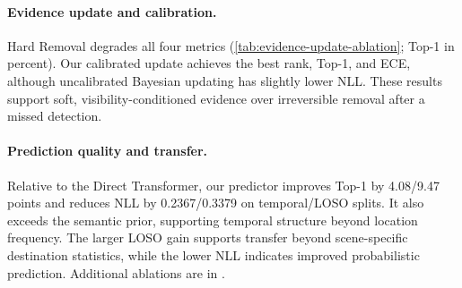 \paragraph{Evidence update and calibration.}
Hard Removal degrades all four metrics (\cref{tab:evidence-update-ablation};
Top-1 in percent). Our calibrated update achieves the best rank, Top-1, and
ECE, although uncalibrated Bayesian updating has slightly lower NLL. These
results support soft, visibility-conditioned evidence over irreversible
removal after a missed detection.


\begin{table}
\vspace{-0.7\baselineskip}
\caption{Current-state prediction on temporal and LOSO splits.}
\label{tab:predictors}
\centering
\scriptsize
\setlength{\tabcolsep}{2.3pt}
\end{table}

\paragraph{Prediction quality and transfer.}
Relative to the Direct Transformer, our predictor improves Top-1 by 4.08/9.47 points and reduces
NLL by 0.2367/0.3379 on temporal/LOSO splits. It also exceeds the semantic
prior, supporting temporal structure beyond location frequency. The larger LOSO
gain supports transfer beyond scene-specific destination statistics, while the
lower NLL indicates improved probabilistic prediction. Additional ablations
are in .

